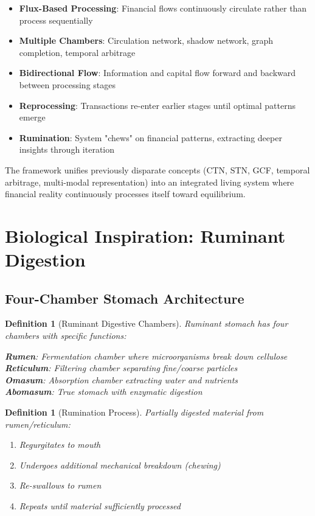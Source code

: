 \documentclass[12pt]{article}
\newtheorem{definition}[theorem]{Definition}
\begin{document}
\begin{itemize}
    \item \textbf{Flux-Based Processing}: Financial flows continuously circulate rather than process sequentially
    \item \textbf{Multiple Chambers}: Circulation network, shadow network, graph completion, temporal arbitrage
    \item \textbf{Bidirectional Flow}: Information and capital flow forward and backward between processing stages
    \item \textbf{Reprocessing}: Transactions re-enter earlier stages until optimal patterns emerge
    \item \textbf{Rumination}: System "chews" on financial patterns, extracting deeper insights through iteration
\end{itemize}

The framework unifies previously disparate concepts (CTN, STN, GCF, temporal arbitrage, multi-modal representation) into an integrated living system where financial reality continuously processes itself toward equilibrium.

\section{Biological Inspiration: Ruminant Digestion}

\subsection{Four-Chamber Stomach Architecture}

\begin{definition}[Ruminant Digestive Chambers]
Ruminant stomach has four chambers with specific functions:

\textbf{Rumen}: Fermentation chamber where microorganisms break down cellulose\\
\textbf{Reticulum}: Filtering chamber separating fine/coarse particles\\
\textbf{Omasum}: Absorption chamber extracting water and nutrients\\
\textbf{Abomasum}: True stomach with enzymatic digestion
\end{definition}

\begin{definition}[Rumination Process]
Partially digested material from rumen/reticulum:
\begin{enumerate}
    \item Regurgitates to mouth
    \item Undergoes additional mechanical breakdown (chewing)
    \item Re-swallows to rumen
    \item Repeats until material sufficiently processed
\end{enumerate}
\end{definition}
\end{document}
